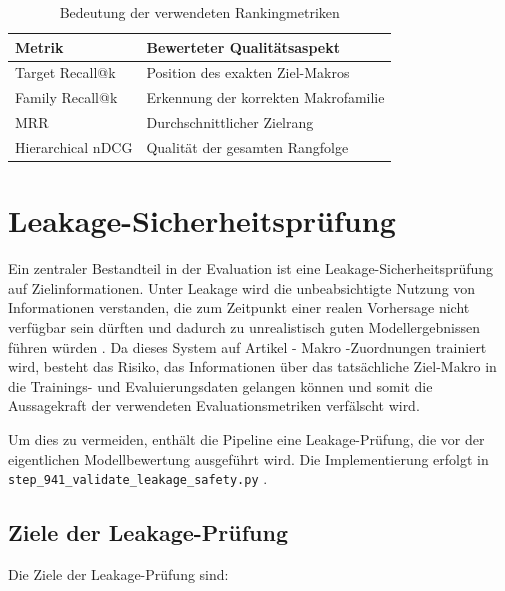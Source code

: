 \begin{table}[tbp]
  \centering
  \setlength{\tabcolsep}{6pt}
  \renewcommand{\arraystretch}{1.1}
  \caption{Bedeutung der verwendeten Rankingmetriken}
  \label{tab:rankingmetriken_bedeutung}
  \begin{tabularx}{\textwidth}{>{\raggedright\arraybackslash}p{4cm} >{\raggedright\arraybackslash}X}
    \toprule
    \textbf{Metrik} & \textbf{Bewerteter Qualitätsaspekt} \\
    \midrule
    Target Recall@k & Position des exakten Ziel-Makros \parencite{EPLAN-Makros} \\
    Family Recall@k & Erkennung der korrekten Makrofamilie \\
    MRR & Durchschnittlicher Zielrang \\
    Hierarchical nDCG & Qualität der gesamten Rangfolge \\
    \bottomrule
  \end{tabularx}
\end{table}


\section{Leakage-Sicherheitsprüfung}

Ein zentraler Bestandteil in der Evaluation ist eine Leakage-Sicherheitsprüfung auf Zielinformationen. 
Unter Leakage wird die unbeabsichtigte Nutzung von Informationen verstanden, die zum Zeitpunkt einer realen Vorhersage nicht verfügbar sein dürften und dadurch zu unrealistisch guten Modellergebnissen führen würden \parencite{kaufman2012leakage}.
Da dieses System auf Artikel \parencite{EPLANArtikelverwaltung} - Makro \parencite{EPLAN-Makros} -Zuordnungen trainiert wird, besteht das Risiko, 
das Informationen über das tatsächliche Ziel-Makro \parencite{EPLAN-Makros} in die Trainings- und Evaluierungsdaten gelangen können und somit die Aussagekraft der verwendeten Evaluationsmetriken verfälscht wird.

Um dies zu vermeiden, enthält die Pipeline eine Leakage-Prüfung, die vor der eigentlichen Modellbewertung ausgeführt wird.
Die Implementierung erfolgt in \texttt{step\_941\_\allowbreak validate\_leakage\_\allowbreak safety.py} \parencite{srcStep941}.

\subsection{Ziele der Leakage-Prüfung}

Die Ziele der Leakage-Prüfung sind:


